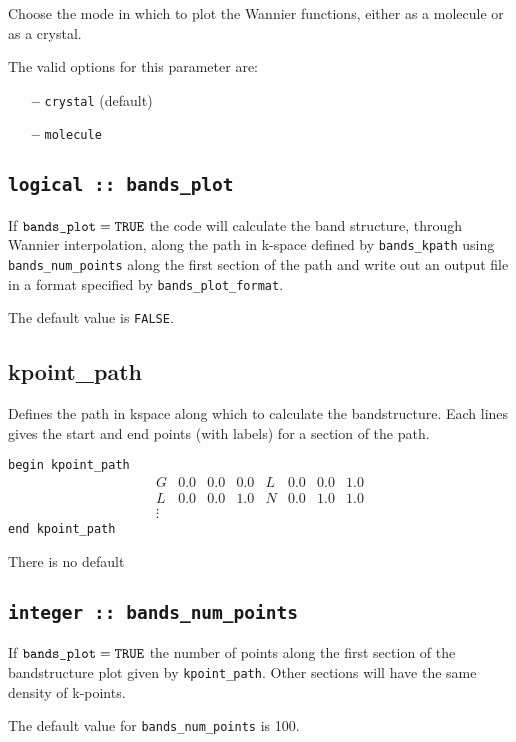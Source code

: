 Choose the mode in which to plot the Wannier functions, either as a molecule
or as a crystal.

The valid options for this parameter are:
\begin{itemize}
\item[{\bf --}] \verb#crystal# (default)
\item[{\bf --}] \verb#molecule# 
\end{itemize}

\subsection[bands\_plot]{\tt logical :: bands\_plot}

If $\verb#bands_plot#=\verb#TRUE#$ the code will calculate the band
structure, through Wannier interpolation,
 along
the path in k-space defined by \verb#bands_kpath# using \verb#bands_num_points# along the first
section of the path and write out an output file in a format specified
by \verb#bands_plot_format#. 

The default value is \verb#FALSE#.


\subsection[kpoint\_path]{kpoint\_path}
Defines the path in kspace along which to calculate the
bandstructure. Each lines gives the start and end points (with labels)
for a section of the path.

\noindent  \verb#begin kpoint_path#
$$
\begin{array}{cccccccc}
G & 0.0 & 0.0 & 0.0 & L & 0.0 & 0.0 & 1.0 \\
L & 0.0 & 0.0 & 1.0 & N & 0.0 & 1.0 & 1.0 \\
\vdots
\end{array}
$$
\verb#end kpoint_path#


There is no default

\subsection[bands\_num\_points]{\tt integer :: bands\_num\_points}

If $\verb#bands_plot#=\verb#TRUE#$ the number of points along the first
section of the bandstructure plot given by \verb#kpoint_path#. Other
sections will have the same density of k-points.

The default value for \verb#bands_num_points# is 100.


